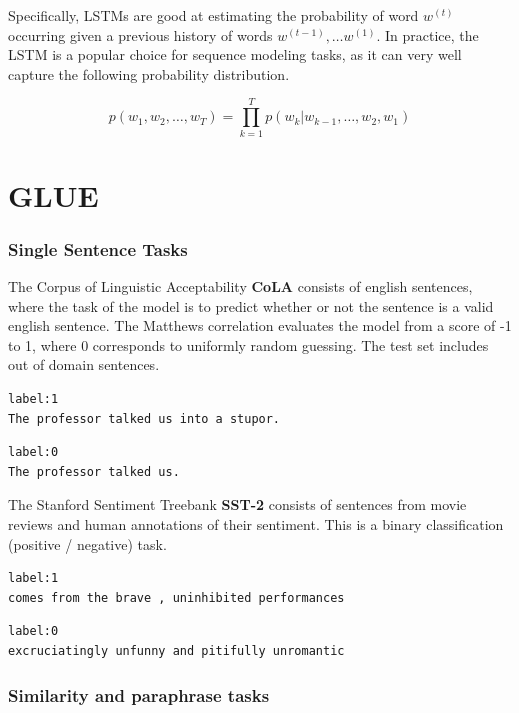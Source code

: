\documentclass[a4paper,12pt,oneside,openright]{report}
\begin{document}
Specifically, LSTMs \cite{hochreiter97} are good at estimating the probability of word $w^{(t)}$ occurring given a previous history of words $w^{(t-1)}, \ldots w^{(1)}$.
In practice, the LSTM is a popular choice for sequence modeling tasks, as it can very well capture the following probability distribution.

\begin{equation}
p\left(w_{1},  w_{2}, \ldots, w_{T} \right)=\prod_{k=1}^{T} p\left(w_{k} | w_{k-1}, \ldots, w_{2}, w_{1}\right)
\end{equation}

\section{GLUE}\label{appendix:GLUE}

\subsubsection{Single Sentence Tasks}

The Corpus of Linguistic Acceptability \textbf{CoLA} \cite{warstadt2018} consists of english sentences, where the task of the model is to predict whether or not the sentence is a valid english sentence.
The Matthews correlation evaluates the model from a score of -1 to 1, where 0 corresponds to uniformly random guessing.
The test set includes out of domain sentences.

\begin{verbatim}
label:1
The professor talked us into a stupor.
\end{verbatim}

\begin{verbatim}
label:0	
The professor talked us.
\end{verbatim}

The Stanford Sentiment Treebank \textbf{SST-2} \cite{socher2013} consists of sentences from movie reviews and human annotations of their sentiment.
This is a binary classification (positive / negative) task.

\begin{verbatim}
label:1
comes from the brave , uninhibited performances
\end{verbatim}

\begin{verbatim}
label:0
excruciatingly unfunny and pitifully unromantic
\end{verbatim}

\subsubsection{Similarity and paraphrase tasks}
\end{document}
